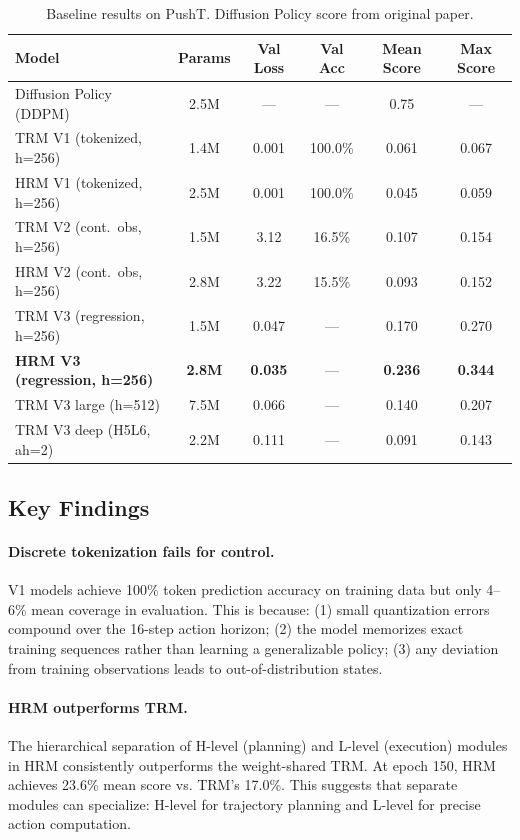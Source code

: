 \documentclass[11pt,a4paper]{article}
\begin{document}
\begin{table}[h]
\centering
\caption{Baseline results on PushT. Diffusion Policy score from original paper.}
\begin{tabular}{lccccc}
\toprule
\textbf{Model} & \textbf{Params} & \textbf{Val Loss} & \textbf{Val Acc} & \textbf{Mean Score} & \textbf{Max Score} \\
\midrule
Diffusion Policy (DDPM) & 2.5M & --- & --- & 0.75 & --- \\
TRM V1 (tokenized, h=256) & 1.4M & 0.001 & 100.0\% & 0.061 & 0.067 \\
HRM V1 (tokenized, h=256) & 2.5M & 0.001 & 100.0\% & 0.045 & 0.059 \\
\midrule
TRM V2 (cont.\ obs, h=256) & 1.5M & 3.12 & 16.5\% & 0.107 & 0.154 \\
HRM V2 (cont.\ obs, h=256) & 2.8M & 3.22 & 15.5\% & 0.093 & 0.152 \\
\midrule
TRM V3 (regression, h=256) & 1.5M & 0.047 & --- & 0.170 & 0.270 \\
\textbf{HRM V3 (regression, h=256)} & \textbf{2.8M} & \textbf{0.035} & --- & \textbf{0.236} & \textbf{0.344} \\
TRM V3 large (h=512) & 7.5M & 0.066 & --- & 0.140 & 0.207 \\
TRM V3 deep (H5L6, ah=2) & 2.2M & 0.111 & --- & 0.091 & 0.143 \\
\bottomrule
\end{tabular}
\end{table}

\subsection{Key Findings}

\paragraph{Discrete tokenization fails for control.} V1 models achieve 100\% token prediction accuracy on training data but only 4--6\% mean coverage in evaluation. This is because: (1) small quantization errors compound over the 16-step action horizon; (2) the model memorizes exact training sequences rather than learning a generalizable policy; (3) any deviation from training observations leads to out-of-distribution states.

\paragraph{HRM outperforms TRM.} The hierarchical separation of H-level (planning) and L-level (execution) modules in HRM consistently outperforms the weight-shared TRM. At epoch 150, HRM achieves 23.6\% mean score vs. TRM's 17.0\%. This suggests that separate modules can specialize: H-level for trajectory planning and L-level for precise action computation.
\end{document}
